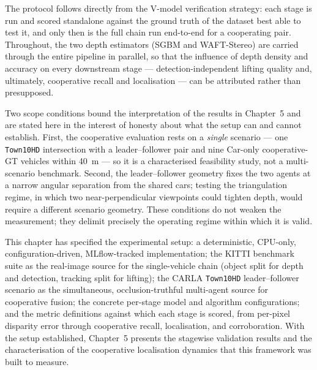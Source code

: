 The protocol follows directly from the V-model verification strategy: each stage is
run and scored standalone against the ground truth of the dataset best able to test
it, and only then is the full chain run end-to-end for a cooperating pair. Throughout,
the two depth estimators (SGBM and WAFT-Stereo) are carried through the entire
pipeline in parallel, so that the influence of depth density and accuracy on every
downstream stage --- detection-independent lifting quality and, ultimately,
cooperative recall and localisation --- can be attributed rather than presupposed.

Two scope conditions bound the interpretation of the results in Chapter~5 and are
stated here in the interest of honesty about what the setup can and cannot establish.
First, the cooperative evaluation rests on a \emph{single} scenario --- one
\texttt{Town10HD} intersection with a leader--follower pair and nine Car-only
cooperative-GT vehicles within 40~m --- so it is a characterised feasibility study,
not a multi-scenario benchmark. Second, the leader--follower geometry fixes the two
agents at a narrow angular separation from the shared cars; testing the
triangulation regime, in which two near-perpendicular viewpoints could tighten depth,
would require a different scenario geometry. These conditions do not weaken the
measurement; they delimit precisely the operating regime within which it is valid.

\bigskip
\noindent This chapter has specified the experimental setup: a deterministic, CPU-only,
configuration-driven, MLflow-tracked implementation; the KITTI benchmark suite as the
real-image source for the single-vehicle chain (object split for depth and detection,
tracking split for lifting); the CARLA \texttt{Town10HD} leader--follower scenario as
the simultaneous, occlusion-truthful multi-agent source for cooperative fusion; the
concrete per-stage model and algorithm configurations; and the metric definitions
against which each stage is scored, from per-pixel disparity error through cooperative
recall, localisation, and corroboration. With the setup established, Chapter~5
presents the stagewise validation results and the characterisation of the cooperative
localisation dynamics that this framework was built to measure.
